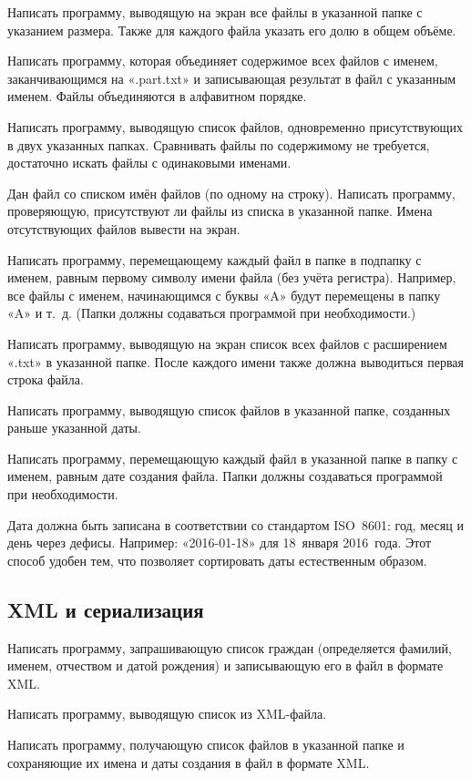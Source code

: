 \task Написать программу, выводящую на экран все файлы в указанной
папке с указанием размера. Также для каждого файла указать его долю в
общем объёме.

\task Написать программу, которая объединяет содержимое всех файлов с
именем, заканчивающимся на «.part.txt» и записывающая результат в файл
с указанным именем. Файлы объединяются в алфавитном порядке.

\task Написать программу, выводящую список файлов, одновременно
присутствующих в двух указанных папках. Сравнивать файлы по
содержимому не требуется, достаточно искать файлы с одинаковыми
именами.

\task Дан файл со списком имён файлов (по одному на строку). Написать
программу, проверяющую, присутствуют ли файлы из списка в указанной
папке. Имена отсутствующих файлов вывести на экран.

\task Написать программу, перемещающему каждый файл в папке в подпапку
с именем, равным первому символу имени файла (без учёта
регистра). Например, все файлы с именем, начинающимся с буквы «A»
будут перемещены в папку «A» и т.~д. (Папки должны содаваться
программой при необходимости.)

\task Написать программу, выводящую на экран список всех файлов с
расширением «.txt» в указанной папке. После каждого имени также должна
выводиться первая строка файла.

\task Написать программу, выводящую список файлов в указанной папке,
созданных раньше указанной даты.

\task Написать программу, перемещающую каждый файл в указанной папке в
папку с именем, равным дате создания файла. Папки должны создаваться
программой при необходимости.

Дата должна быть записана в соответствии со стандартом ISO~8601: год,
месяц и день через дефисы. Например: «2016-01-18» для 18~января
2016~года. Этот способ удобен тем, что позволяет сортировать даты
естественным образом.


\subsection{XML и сериализация}

\task Написать программу, запрашивающую список граждан (определяется
фамилий, именем, отчеством и датой рождения) и записывающую его в
файл в формате XML.

Написать программу, выводящую список из XML-файла.

\task Написать программу, получающую список файлов в указанной папке и
сохраняющие их имена и даты создания в файл в формате XML.

